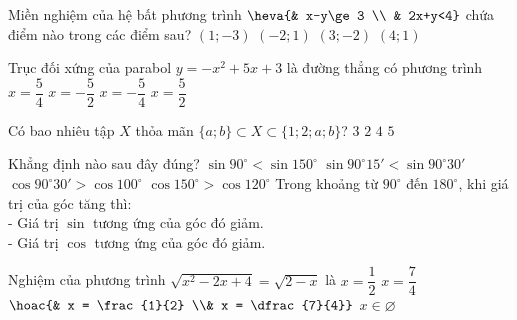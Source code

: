 \begin{ex}%
Miền nghiệm của hệ bất phương trình $\heva{& x-y\ge 3 \\ & 2x+y<4}$ chứa điểm nào trong các điểm sau?
\choice
{\True $(1;-3)$}
{$(-2;1)$}
{$(3;-2)$}
{$(4;1)$}
\end{ex}

\begin{ex}%
Trục đối xứng của parabol $y=-x^2+5x+3$ là đường thẳng có phương trình
\choice
{$x=\dfrac{5}{4}$}
{$x=-\dfrac{5}{2}$}
{$x=-\dfrac{5}{4}$}
{\True $x=\dfrac{5}{2}$}
\end{ex}

\begin{ex}%
Có bao nhiêu tập $ X $ thỏa mãn $ \{a;b\} \subset X \subset \{1;2;a;b\}$?
\choice
{$3$}
{$2$}
{\True $4$}
{$5$}
\end{ex}


\begin{ex}%
Khẳng định nào sau đây đúng?
\choice
{$\sin 90^\circ <\sin 150^\circ $}
{$\sin 90^\circ 1{5}'<\sin 90^\circ 30'$}
{\True $\cos 90^\circ 30'>\cos 100^\circ $}
{$\cos 150^\circ >\cos 120^\circ $}
\loigiai
{Trong khoảng từ $90^\circ $ đến $180^\circ $, khi giá trị của góc tăng thì:\\
- Giá trị $\sin$ tương ứng của góc đó giảm.\\
- Giá trị $\cos$ tương ứng của góc đó giảm.}
\end{ex}

\begin{ex}%
Nghiệm của phương trình $\sqrt{x^2 - 2x + 4} = \sqrt{2 - x}$ là
\choice
{$x = \dfrac{1}{2} $}
{$x = \dfrac{7}{4} $}
{$\hoac{& x = \frac{1}{2} \\& x = \dfrac{7}{4}}$}
{\True $x \in \varnothing $}
\end{ex}

